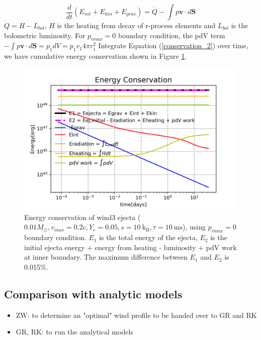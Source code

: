 \documentclass[fleqn,usenatbib]{mnras}
\begin{document}
\begin{equation}
\label{conservation_2}
	\frac{d}{dt}(E_{int} + E_{kin}+E_{grav}) = \dot Q - \int p \boldsymbol{v} \cdot d \boldsymbol{S} 
\end{equation}
$\dot Q = H - L_{bol}$, $H$ is the heating from decay of r-process elements and $L_{bol}$ is the bolometric luminosity. For $p_{imax}=0$ boundary condition, the pdV term $-\int p \boldsymbol{v} \cdot d \boldsymbol{S} = p_{1} dV = p_{1} v_1 4\pi r_1^2$  
Integrate Equation (\ref{conservation_2}) over time, we have cumulative energy conservation shown in Figure \ref{energy_conservation}.
 

\begin{figure}
\centering
\includegraphics[scale=0.6]{figures/energy_conservation_wind3_Apr2.png}
\caption{Energy conservation of wind3 ejecta ($0.01M_{\odot}, v_{max}=0.2c, Y_e=0.05, s=10\ \mathrm{k_B}, \tau=10\ \mathrm{ ms}$), using $p_{imax}=0$ boundary condition. $E_1$ is the total energy of the ejecta, $E_2$ is the initial ejecta energy + energy from heating - luminosity + pdV work at inner boundary. The maximum difference between $E_1$ and $E_2$ is 0.015\%.}
\label{energy_conservation}
\end{figure}



\subsection{Comparison with analytic models}
\begin{itemize}
    \item ZW: to determine an "optimal" wind profile to be handed over to GR and RK
    \item GR, RK: to run the analytical models
\end{itemize}
\end{document}
